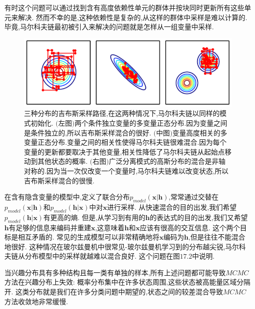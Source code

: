 有时这个问题可以通过找到含有高度依赖性单元的群体并按块同时更新所有这些单元来解决.
然而不幸的是,这种依赖性是复杂的,从这样的群体中采样是难以计算的.
毕竟,马尔科夫链最初被引入来解决的问题就是怎样从一组变量中采样.

\begin{figure}[htbp]
	\centering
	\includegraphics[width=5in]{fig/chap17/chap17.1.png}
	\caption{三种分布的吉布斯采样路径,在这两种情况下,马尔科夫链以同样的模式初始化.
	$($左图$)$两个条件独立变量的多变量正态分布.因为变量之间是条件独立的,所以吉布斯采样混合的很好.
	$($中图$)$变量高度相关的多变量正态分布.变量之间的相关性使得马尔科夫链很难混合.因为每个变量的更新都要取决于其他变量,相关性降低了马尔科夫链从起始点移动到其他状态的概率.
	$($右图$)$广泛分离模式的高斯分布的混合是非轴对称的.因为当一次仅改变一个变量时,马尔科夫链难以改变状态,所以吉布斯采样混合的很慢.}
	\label{fig:chap17.1.png}
\end{figure}

在含有隐含变量的模型中,定义了联合分布$p_{model}(\bm{x}|\bm{h})$,常常通过交替在$p_{model}(\bm{x}|\bm{h})$和$p_{model}(\bm{h}|\bm{x})$中对$\bm{x}$进行采样.
从快速混合的目的出发,我们希望$p_{model}(\bm{h}|\bm{x})$有更高的熵.
但是,从学习到有用的$\bm{h}$的表达式的目的出发,我们又希望$\bm{h}$有足够的信息来编码并重建$\bm{x}$,这意味着$\bm{h}$和$\bm{x}$应该有很高的交互信息.
这个两个目标是相互矛盾的.
常见的生成模型可以非常精确地将$\bm{x}$编码为$\bm{h}$,但是往往不能混合地很好.
这种情况在玻尔兹曼机中很常见-玻尔兹曼机学习到的分布越尖锐,马尔科夫链从分布模型中的采样就越难以混合良好.
这个问题在图$17.2$中说明.

当兴趣分布具有多种结构且每一类有单独的样本,所有上述问题都可能导致$MCMC$方法在兴趣分布上失效:
概率分布集中在许多状态周围,这些状态被高能量区域分隔开.
这类分布就是我们在许多分类问题中期望的,状态之间的较差混合导致$MCMC$方法收敛地非常缓慢.

